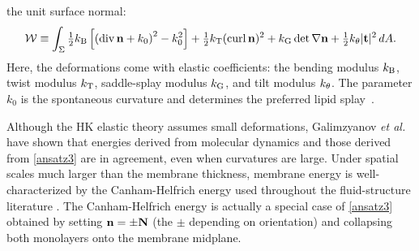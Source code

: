 the unit surface normal:
\begin{equation}
\label{ansatz3}
{\cal W} \equiv \int_{\Sigma} 
  \tfrac{1}{2}k_{\mathrm{B}}\left[ \left( \operatorname{div} {\bf n} + k_0\right)^2 - k_0^2\right] 
+ \tfrac{1}{2}k_{\mathrm{T}} (\operatorname{curl} {\bf n})^2 + k_{\mathrm{G}}  \det \nabla {\bf n} + \tfrac{1}{2}k_{\theta} |{\bf t}|^2 \,dA.
\end{equation}
Here, 
the deformations come with elastic coefficients: the bending modulus
$k_{\mathrm{B}}$, twist modulus $k_{\mathrm{T}}$, saddle-splay modulus $k_{\mathrm{G}}$, and tilt modulus
$k_{\theta}$.
%
The parameter $k_0$ is the spontaneous curvature and determines the
preferred lipid splay~\cite{RoLi15,Kozlov2007}.  

Although the HK elastic theory assumes small deformations, 
Galimzyanov {\em et al.}~\cite{C9SM02079A} have shown that energies derived from
molecular dynamics and those derived from \eqref{ansatz3} are in agreement, even when curvatures are large.
Under spatial scales much larger than the
membrane thickness, membrane energy is well-characterized by the
Canham-Helfrich energy used throughout the fluid-structure literature
\cite{QiangDu09, Lowengrub07,KimLai2010_JCP, Hu, HuLaiSeolEtAl2016_JCP,
  qua-bir2014, qua-vee-you2019}.
The Canham-Helfrich energy is actually a special case of
\eqref{ansatz3} obtained by setting ${\bf n} =  \pm {\bf N}$ (the $\pm$ depending on
orientation) and collapsing both monolayers onto the membrane midplane.

